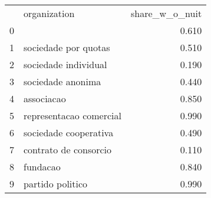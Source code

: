 \begin{tabular}{llr}
 & organization & share_w_o_nuit \\
0 &  & 0.610 \\
1 & sociedade por quotas & 0.510 \\
2 & sociedade individual & 0.190 \\
3 & sociedade anonima & 0.440 \\
4 & associacao & 0.850 \\
5 & representacao comercial & 0.990 \\
6 & sociedade cooperativa & 0.490 \\
7 & contrato de consorcio & 0.110 \\
8 & fundacao & 0.840 \\
9 & partido politico & 0.990 \\
\end{tabular}
